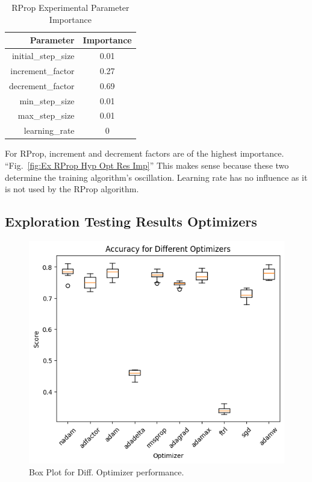 \documentclass[conference]{IEEEtran}
\begin{document}
\begin{table}[htbp]
    \centering
    \begin{tabular}{|r|c|}\hline
 Parameter&Importance\\\hline
        \hline
        initial\_step\_size&0.01\\ \hline
        increment\_factor&0.27\\ \hline
        decrement\_factor&0.69\\ \hline
         min\_step\_size&0.01\\ \hline
        max\_step\_size&0.01\\ \hline
        learning\_rate&0\\\hline
    \end{tabular}
    \caption{RProp Experimental Parameter Importance}
    \label{tab:ExRPropParamImportance}
\end{table}

\FloatBarrier

For RProp, increment and decrement factors are of the highest importance. ``Fig.~\ref{fig:Ex RProp Hyp Opt Res Imp}'' This makes sense because these two determine the training algorithm's oscillation. 
Learning rate has no influence as it is not used by the RProp algorithm.

\subsection{Exploration Testing Results Optimizers}

\begin{figure}[htbp]
\centerline{\includegraphics[width=\columnwidth]{Ex Optis Hyp Opt Res Box Acc.png}}
\caption{Box Plot for Diff. Optimizer performance.}
\label{fig:Ex Optis Hyp Opt Res Box Acc}
\end{figure}
\end{document}
